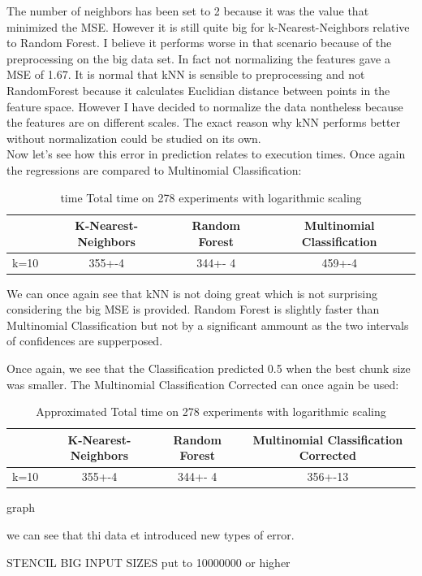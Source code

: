 \documentclass[12pt]{article}
\begin{document}
The number of neighbors has been set to 2 because it was the value that minimized the MSE. However it is still quite big for k-Nearest-Neighbors relative to Random Forest. I believe it performs worse in that scenario because of the preprocessing on the big data set. In fact not normalizing the features gave a MSE of 1.67. It is normal that kNN is sensible to preprocessing and not RandomForest because it calculates Euclidian distance between points in the feature space. However I have decided to normalize the data nontheless because the features are on different scales. The exact reason why kNN performs better without normalization could be studied on its own.
\\

Now let's see how this error in prediction relates to execution times. Once again the regressions are compared to Multinomial Classification:

\begin{table}[h]
	\centering
	\caption{ time Total time on 278 experiments with logarithmic scaling}
	\label{my-label}
	\begin{tabular}{|c|c|c|c|}
		\hline
		& K-Nearest-Neighbors & Random Forest &Multinomial Classification\\ \hline
		k=10  & 355+-4        & 344+- 4&459+-4 \\ \hline
	\end{tabular}
\end{table}

We can once again see that kNN is not doing great which is not surprising considering the big MSE is provided. Random Forest is slightly faster than Multinomial Classification but not by a significant ammount as the two intervals of confidences are supperposed.


Once again, we see that the Classification predicted 0.5 when the best chunk size was smaller. The Multinomial Classification Corrected can once again be used:

\begin{table}[h]
	\centering
	\caption{Approximated Total time on 278 experiments with logarithmic scaling}
	\label{my-label}
	\begin{tabular}{|c|c|c|c|}
		\hline
		& K-Nearest-Neighbors & Random Forest &Multinomial Classification Corrected\\ \hline
		k=10  & 355+-4        & 344+- 4&356+-13 \\ \hline
	\end{tabular}
\end{table}
graph

we can see that thi data et introduced new types of error. 

STENCIL BIG INPUT SIZES 
put to 10000000 or higher
\end{document}
